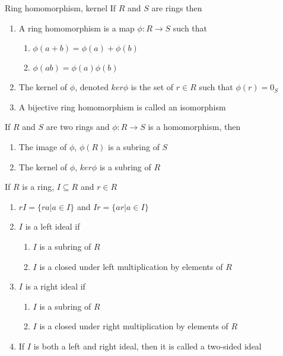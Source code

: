 \documentclass[titlepage, 12pt]{article}
\begin{document}
\begin{definition}{Ring homomorphism, kernel}{}
    If $R$ and $S$ are rings then
    \begin{enumerate}
        \item A ring homomorphism is a map $\phi:R\rightarrow S$ such that
        \begin{enumerate}
            \item $\phi(a+b) = \phi(a) + \phi(b)$
            \item $\phi(ab) = \phi(a)\phi(b)$
        \end{enumerate}
        \item The kernel of $\phi$, denoted $ker\phi$ is the set of $r\in R$
            such that $\phi(r) = 0_S$
        \item A bijective ring homomorphism is called an isomorphism
    \end{enumerate}
\end{definition}

\begin{proposition}{}{}
    If $R$ and $S$ are two rings and $\phi:R\rightarrow S$ is a homomorphism,
    then
    \begin{enumerate}
        \item The image of $\phi$, $\phi(R)$ is a subring of $S$
        \item The kernel of $\phi$, $ker\phi$ is a subring of $R$
    \end{enumerate}
\end{proposition}

\begin{definition}
    If $R$ is a ring, $I\subseteq R$ and $r\in R$
    \begin{enumerate}
        \item $rI = \{ra|a\in I\}$ and $Ir = \{ar|a\in I\}$
        \item $I$ is a left ideal if
            \begin{enumerate}
                \item $I$ is a subring of $R$
                \item $I$ is a closed under left multiplication by elements of $R$
            \end{enumerate}
        \item $I$ is a right ideal if
            \begin{enumerate}
                \item $I$ is a subring of $R$
                \item $I$ is a closed under right multiplication by elements of $R$
            \end{enumerate}
        \item If $I$ is both a left and right ideal, then it is called a
            two-sided ideal
    \end{enumerate}
\end{definition}
\end{document}
